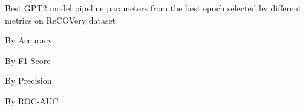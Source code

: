 \begin{table}[!htbp]
    \caption{Best GPT2 model pipeline parameters from the best epoch selected by different metrics on ReCOVery dataset}
    \label{tab:recovery_gpt2_pipeline_params}
    \centering

    \begin{subtable}[t]{0.48\linewidth}
        \scriptsize
        \caption{By Accuracy}
        
    \end{subtable}
    \hfill
    \begin{subtable}[t]{0.48\linewidth}
        \scriptsize
        \caption{By F1-Score}
        
    \end{subtable}

    \vspace{1em}

    \begin{subtable}[t]{0.48\linewidth}
        \scriptsize
        \caption{By Precision}
        
    \end{subtable}
    \hfill
    \begin{subtable}[t]{0.48\linewidth}
        \scriptsize
        \caption{By ROC-AUC}
        
    \end{subtable}

\end{table}